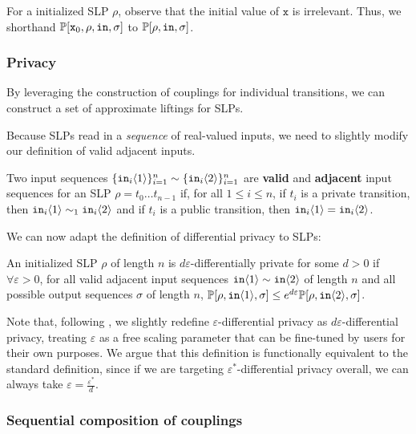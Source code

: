 For a initialized SLP $\rho$, observe that the initial value of $\texttt{x}$ is irrelevant. Thus, we shorthand $\mathbb{P}[\texttt{x}_0, \rho, \texttt{in}, \sigma]$ to $\mathbb{P}[\rho, \texttt{in}, \sigma]$.


\subsubsection{Privacy}

By leveraging the construction of couplings for individual transitions, we can construct a set of approximate liftings for SLPs.

Because SLPs read in a \textit{sequence} of real-valued inputs, we need to slightly modify our definition of valid adjacent inputs.

\begin{defn}
    Two input sequences $\{\texttt{in}_i\langle1 \rangle\}_{i=1}^n\sim\{\texttt{in}_i\langle2 \rangle\}_{i=1}^n$ are \textbf{valid} and \textbf{adjacent} input sequences for an SLP $\rho = t_0\ldots t_{n-1}$ if, for all $1\leq i\leq n$, if $t_i$ is a private transition, then $\texttt{in}_i\langle1 \rangle\sim_1\texttt{in}_i\langle2 \rangle$ and if $t_i$ is a public transition, then $\texttt{in}_i\langle1 \rangle=\texttt{in}_i\langle2 \rangle$.
\end{defn}

We can now adapt the definition of differential privacy to SLPs:
\begin{defn}
    An initialized SLP $\rho$ of length $n$ is $d\varepsilon$-differentially private for some $d>0$ if $\forall \varepsilon>0$, for all valid adjacent input sequences $\texttt{in}\langle1 \rangle\sim \texttt{in}\langle2 \rangle$ of length $n$ and all possible output sequences $\sigma$ of length $n$, $\mathbb{P}[\rho, \texttt{in}\langle1 \rangle, \sigma]\leq e^{d\varepsilon}\mathbb{P}[\rho, \texttt{in}\langle2 \rangle, \sigma]$.
\end{defn}

Note that, following \cite{chadhaLinearTimeDecidability2021}, we slightly redefine $\varepsilon$-differential privacy as $d\varepsilon$-differential privacy, treating $\varepsilon$ as a free scaling parameter that can be fine-tuned by users for their own purposes. 
We argue that this definition is functionally equivalent to the standard definition, since if we are targeting $\varepsilon^*$-differential privacy overall, we can always take $\varepsilon = \frac{\varepsilon^*}{d}$.

\subsubsection{Sequential composition of couplings}

